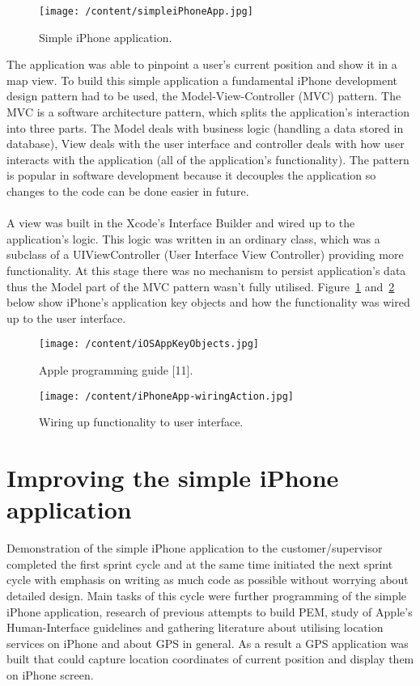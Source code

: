 \documentclass[12pt, a4paper]{report}   %
\begin{document}
\begin{enumerate}
\begin{figure}[H]
  \centering
	\texttt{[image: /content/simpleiPhoneApp.jpg]}
	  \caption{Simple iPhone application.}
\end{figure}


The application was able to pinpoint a user's current position and show it in a map view. To build this simple application a fundamental iPhone development design pattern had to be used, the Model-View-Controller (MVC) pattern. The MVC is a software architecture pattern, which splits the application’s interaction into three parts. The Model deals with business logic (handling a data stored in database), View deals with the user interface and controller deals with how user interacts with the application (all of the application’s functionality). The pattern is popular in software development because it decouples the application so changes to the code can be done easier in future. \\ \\
A view was built in the Xcode's Interface Builder and wired up to the application's logic. This logic was written in an ordinary class, which was a subclass of a UIViewController (User Interface View Controller) providing more functionality. At this stage there was no mechanism to persist application's data thus the Model part of the MVC pattern wasn't fully utilised. Figure~\ref{iOSAppKeyObjects} and~\ref{iPhoneApp-wiringAction} below show iPhone's application key objects and how the functionality was wired up to the user interface.


\begin{figure}[H]
  \centering
	\texttt{[image: /content/iOSAppKeyObjects.jpg]}
	  \caption{Apple programming guide [11].}
	  \label{iOSAppKeyObjects}
\end{figure}

\begin{figure}[H]
  \centering
	\texttt{[image: /content/iPhoneApp-wiringAction.jpg]}
	  \caption{Wiring up functionality to user interface.}
	  \label{iPhoneApp-wiringAction}
\end{figure}


\clearpage
\section{Improving the simple iPhone application}
Demonstration of the simple iPhone application to the customer/supervisor completed the first sprint cycle and at the same time initiated the next sprint cycle with emphasis on writing as much code as possible without worrying about detailed design. Main tasks of this cycle were further programming of the simple iPhone application, research of previous attempts to build PEM, study of Apple's Human-Interface guidelines and gathering literature about utilising location services on iPhone and about GPS in general. As a result a GPS application was built that could capture location coordinates of current position and display them on iPhone screen.



\end{enumerate}
\end{document}
